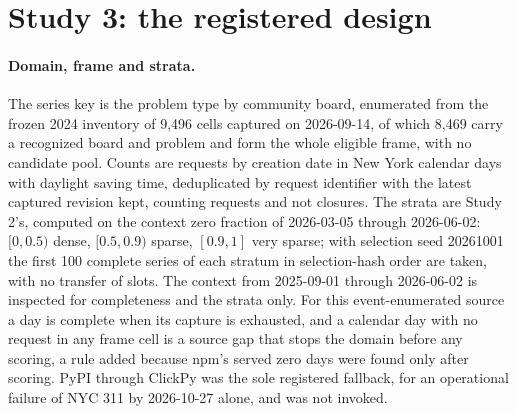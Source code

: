 \providecommand{\qs}{QScore9}
\providecommand{\hc}{\texttt{hurdle\_count\_28}}

\section{Study 3: the registered design}
\label{sec:s3design}

\paragraph{Domain, frame and strata.} The series key is the problem type by community board, enumerated
from the frozen 2024 inventory of 9,496 cells captured on 2026-09-14, of which 8,469 carry a recognized
board and problem and form the whole eligible frame, with no candidate pool. Counts are requests by
creation date in New York calendar days with daylight saving time, deduplicated by request identifier with
the latest captured revision kept, counting requests and not closures. The strata are Study 2's, computed
on the context zero fraction of 2026-03-05 through 2026-06-02: $[0, 0.5)$ dense, $[0.5, 0.9)$ sparse,
$[0.9, 1]$ very sparse; with selection seed 20261001 the first 100 complete series of each stratum in
selection-hash order are taken, with no transfer of slots. The context from 2025-09-01 through 2026-06-02
is inspected for completeness and the strata only. For this event-enumerated source a day is complete when
its capture is exhausted, and a calendar day with no request in any frame cell is a source gap that stops
the domain before any scoring, a rule added because npm's served zero days were found only after scoring.
PyPI through ClickPy was the sole registered fallback, for an operational failure of NYC 311 by 2026-10-27
alone, and was not invoked.

